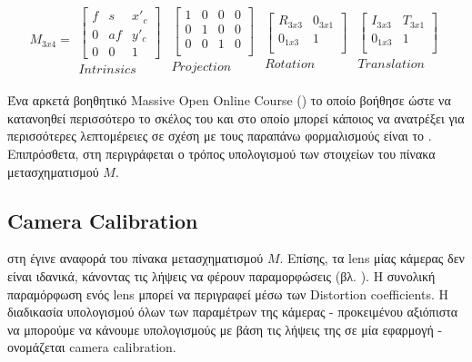 \begin{gather}
	M_{3x4} = 
    \begin{matrix}
        \begin{bmatrix} 
            f & s & x'_c \\ 
            0 & af & y'_c \\
            0  & 0 & 1
        \end{bmatrix}\\
        Intrinsics
    \end{matrix}
    \begin{matrix}
        \begin{bmatrix} 
            1 & 0 & 0 & 0 \\ 
            0 & 1 & 0 & 0 \\ 
            0 & 0 & 1 & 0 \\ 
        \end{bmatrix}\\
        Projection
    \end{matrix}
    \begin{matrix}
        \begin{bmatrix} 
            R_{3x3} & 0_{3x1} \\ 
            0_{1x3} & 1 \\  
        \end{bmatrix}\\
        Rotation
    \end{matrix}
    \begin{matrix}
        \begin{bmatrix} 
            I_{3x3} & T_{3x1} \\ 
            0_{1x3} & 1 \\  
        \end{bmatrix}\\
        Translation
    \end{matrix} \label{eq:world-to-image-matrix}
\end{gather}

Ένα αρκετά βοηθητικό Massive Open Online Course () το οποίο βοήθησε ώστε να κατανοηθεί περισσότερο το σκέλος του  και στο οποίο μπορεί κάποιος να ανατρέξει για περισσότερες λεπτομέρειες σε σχέση με τους παραπάνω φορμαλισμούς είναι το \cite{introduction-to-computer-vision}. Επιπρόσθετα, στη  περιγράφεται ο τρόπος υπολογισμού των στοιχείων του πίνακα μετασχηματισμού $M$.

\subsection{Camera Calibration} \label{sec:camera-calibration}
στη  έγινε αναφορά του πίνακα μετασχηματισμού $M$. Επίσης, τα lens μίας κάμερας δεν είναι ιδανικά, κάνοντας τις λήψεις να φέρουν παραμορφώσεις (βλ. ). Η συνολική παραμόρφωση ενός lens μπορεί να περιγραφεί μέσω των Distortion coefficients. Η διαδικασία υπολογισμού όλων των παραμέτρων της κάμερας - προκειμένου αξιόπιστα να μπορούμε να κάνουμε υπολογισμούς με βάση τις λήψεις της σε μία  εφαρμογή - ονομάζεται camera calibration. 

